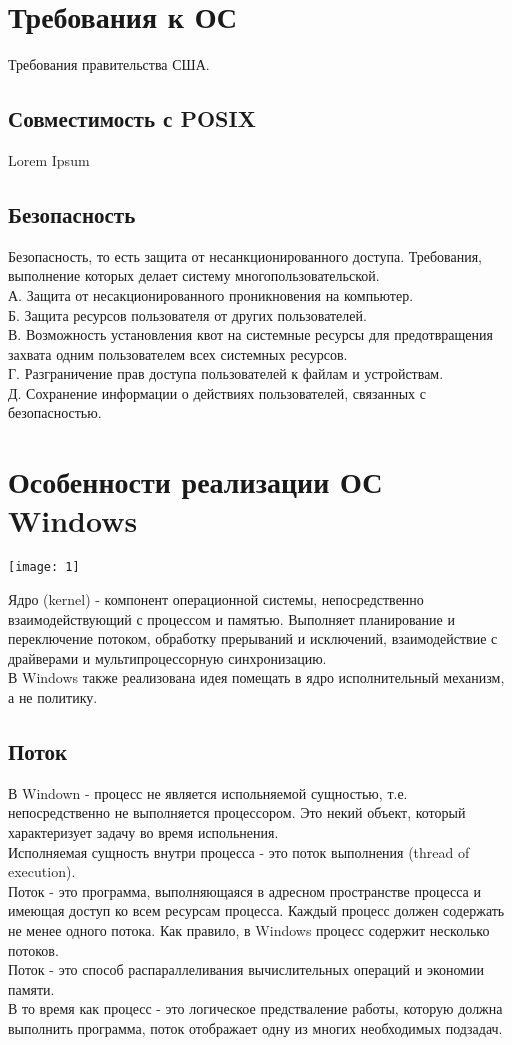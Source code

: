 \documentclass[a4paper]{article}
\begin{document}
\section*{Требования к ОС}
\setcounter{section}{2}
Требования правительства США.
\subsection{Совместимость с POSIX}%
\setcounter{subsection}{6}
Lorem Ipsum
\subsection{Безопасность}%
\setcounter{subsection}{7}
Безопасность, то есть защита от несанкционированного доступа. Требования, выполнение которых делает систему многопользовательской.\\
А. Защита от несакционированного проникновения на компьютер.\\
Б. Защита ресурсов пользователя от других пользователей.\\
В. Возможность установления квот на системные ресурсы для предотвращения захвата одним пользователем всех системных ресурсов.\\
Г. Разграничение прав доступа пользователей к файлам и устройствам.\\
Д. Сохранение информации о действиях пользователей, связанных с безопасностью.\\
\section*{Особенности реализации ОС Windows}
\setcounter{section}{3}
\setcounter{subsection}{0}
\begin{center}	
	\texttt{[image: 1]}
\end{center}
Ядро (kernel) - компонент операционной системы, непосредственно взаимодействующий с процессом и памятью. Выполняет планирование и переключение потоком, обработку прерываний и исключений, взаимодействие с драйверами и мультипроцессорную синхронизацию.\\
В Windows также реализована идея помещать в ядро исполнительный механизм, а не политику.\\
\subsection{Поток}%
В Windown - процесс не является испольняемой сущностью, т.е. непосредственно не выполняется процессором. Это некий объект, который характеризует задачу во время испольнения.\\
Исполняемая сущность внутри процесса - это поток выполнения (thread of execution).\\
Поток - это программа, выполняющаяся в адресном пространстве процесса и имеющая доступ ко всем ресурсам процесса. Каждый процесс должен содержать не менее одного потока. Как правило, в Windows процесс содержит несколько потоков.\\
Поток - это способ распараллеливания вычислительных операций и экономии памяти.\\
В то время как процесс - это логическое предстваление работы, которую должна выполнить программа, поток отображает одну из многих необходимых подзадач.\\
\end{document}
